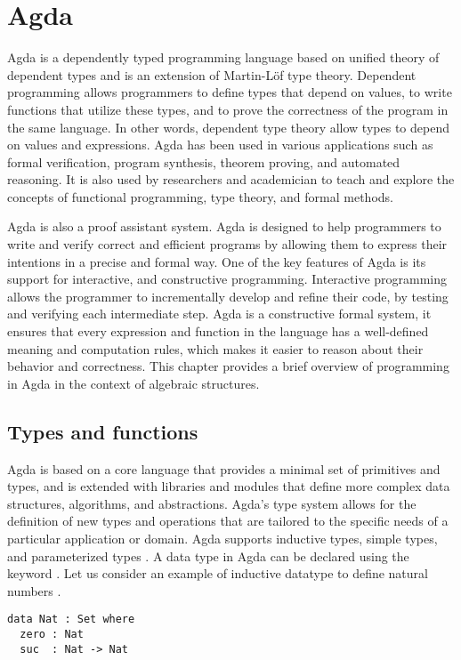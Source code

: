 \chapter{Agda}
Agda is a dependently typed programming language based on unified theory of
dependent types and is an extension of Martin-Löf type theory. Dependent
programming allows programmers to define types that depend on values, to write
functions that utilize these types, and to prove the correctness of the program
in the same language. In other words, dependent type theory allow types to
depend on values and expressions. Agda has been used in various applications
such as formal verification, program synthesis, theorem proving, and automated
reasoning. It is also used by researchers and academician to teach and explore
the concepts of functional programming, type theory, and formal methods.

Agda is also a proof assistant system. Agda is designed to help programmers to
write and verify correct and efficient programs by allowing them to express
their intentions in a precise and formal way. One of the key features of Agda is
its support for interactive, and constructive programming. Interactive
programming allows the programmer to incrementally develop and refine their
code, by testing and verifying each intermediate step. Agda is a constructive
formal system, it ensures that every expression and function in the language has
a well-defined meaning and computation rules, which makes it easier to reason
about their behavior and correctness. This chapter provides a brief overview of
programming in Agda in the context of algebraic structures. 

\section{Types and functions}
Agda is based on a core language that provides a minimal set of primitives and
types, and is extended with libraries and modules that define more complex data
structures, algorithms, and abstractions. Agda's type system allows for the
definition of new types and operations that are tailored to the specific needs
of a particular application or domain. Agda supports inductive types, simple
types, and parameterized types \cite{10.1007/978-3-642-03359-9_6}. A data type
in Agda can be declared using the keyword . Let us consider an
example of inductive datatype to define natural numbers .

\label{code:Nat}
\begin{verbatim}
data Nat : Set where
  zero : Nat
  suc  : Nat -> Nat
\end{verbatim}

